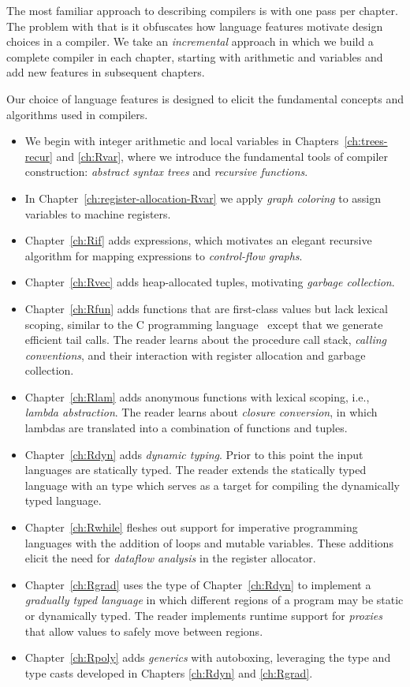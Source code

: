 \documentclass[11pt]{book}
\begin{document}

The most familiar approach to describing compilers is with one pass
per chapter.  The problem with that is it obfuscates how language
features motivate design choices in a compiler. We take an
\emph{incremental} approach in which we build a complete compiler in
each chapter, starting with arithmetic and variables and add new
features in subsequent chapters.

Our choice of language features is designed to elicit the fundamental
concepts and algorithms used in compilers.
\begin{itemize}
\item We begin with integer arithmetic and local variables in
  Chapters~\ref{ch:trees-recur} and \ref{ch:Rvar}, where we introduce
  the fundamental tools of compiler construction: \emph{abstract
    syntax trees} and \emph{recursive functions}. 
\item In Chapter~\ref{ch:register-allocation-Rvar} we apply
  \emph{graph coloring} to assign variables to machine registers.
\item Chapter~\ref{ch:Rif} adds  expressions, which motivates
  an elegant recursive algorithm for mapping expressions to
  \emph{control-flow graphs}.
\item Chapter~\ref{ch:Rvec} adds heap-allocated tuples, motivating
  \emph{garbage collection}.
\item Chapter~\ref{ch:Rfun} adds functions that are first-class values
  but lack lexical scoping, similar to the C programming
  language~\citep{Kernighan:1988nx} except that we generate efficient
  tail calls. The reader learns about the procedure call stack,
  \emph{calling conventions}, and their interaction with register
  allocation and garbage collection.
\item Chapter~\ref{ch:Rlam} adds anonymous functions with lexical
  scoping, i.e., \emph{lambda abstraction}. The reader learns about
  \emph{closure conversion}, in which lambdas are translated into a
  combination of functions and tuples.
\item Chapter~\ref{ch:Rdyn} adds \emph{dynamic typing}. Prior to this
  point the input languages are statically typed.  The reader extends
  the statically typed language with an  type which serves
  as a target for compiling the dynamically typed language.
\item Chapter~\ref{ch:Rwhile} fleshes out support for imperative
  programming languages with the addition of loops and mutable
  variables. These additions elicit the need for \emph{dataflow
    analysis} in the register allocator.
\item Chapter~\ref{ch:Rgrad} uses the  type of
  Chapter~\ref{ch:Rdyn} to implement a \emph{gradually typed language}
  in which different regions of a program may be static or dynamically
  typed. The reader implements runtime support for \emph{proxies} that
  allow values to safely move between regions.
\item Chapter~\ref{ch:Rpoly} adds \emph{generics} with autoboxing,
  leveraging the  type and type casts developed in Chapters
  \ref{ch:Rdyn} and \ref{ch:Rgrad}.
\end{itemize}
\end{document}
